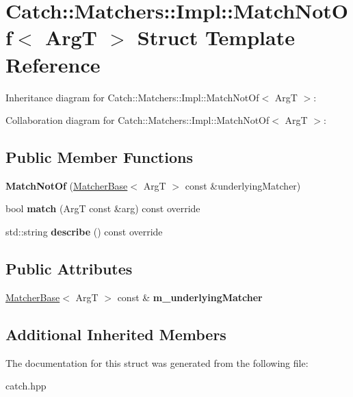 \hypertarget{structCatch_1_1Matchers_1_1Impl_1_1MatchNotOf}{}\section{Catch\+:\+:Matchers\+:\+:Impl\+:\+:Match\+Not\+Of$<$ ArgT $>$ Struct Template Reference}
\label{structCatch_1_1Matchers_1_1Impl_1_1MatchNotOf}


Inheritance diagram for Catch\+:\+:Matchers\+:\+:Impl\+:\+:Match\+Not\+Of$<$ ArgT $>$\+:


Collaboration diagram for Catch\+:\+:Matchers\+:\+:Impl\+:\+:Match\+Not\+Of$<$ ArgT $>$\+:
\subsection*{Public Member Functions}
\begin{DoxyCompactItemize}
\item 
\mbox{\label{structCatch_1_1Matchers_1_1Impl_1_1MatchNotOf_a47afdd9e4c3354cef85adc3186097ae4}} 
{\bfseries Match\+Not\+Of} (\hyperlink{structCatch_1_1Matchers_1_1Impl_1_1MatcherBase}{Matcher\+Base}$<$ ArgT $>$ const \&underlying\+Matcher)
\item 
\mbox{\label{structCatch_1_1Matchers_1_1Impl_1_1MatchNotOf_a181d693c0258e582d80dc6117a1f2b66}} 
bool {\bfseries match} (ArgT const \&arg) const override
\item 
\mbox{\label{structCatch_1_1Matchers_1_1Impl_1_1MatchNotOf_ac5fb4ef6a9069d23a4098c3c818f06b0}} 
std\+::string {\bfseries describe} () const override
\end{DoxyCompactItemize}
\subsection*{Public Attributes}
\begin{DoxyCompactItemize}
\item 
\mbox{\label{structCatch_1_1Matchers_1_1Impl_1_1MatchNotOf_af7ac67f112b0e93796b048a47329aad4}} 
\hyperlink{structCatch_1_1Matchers_1_1Impl_1_1MatcherBase}{Matcher\+Base}$<$ ArgT $>$ const  \& {\bfseries m\+\_\+underlying\+Matcher}
\end{DoxyCompactItemize}
\subsection*{Additional Inherited Members}


The documentation for this struct was generated from the following file\+:\begin{DoxyCompactItemize}
\item 
catch.\+hpp\end{DoxyCompactItemize}
